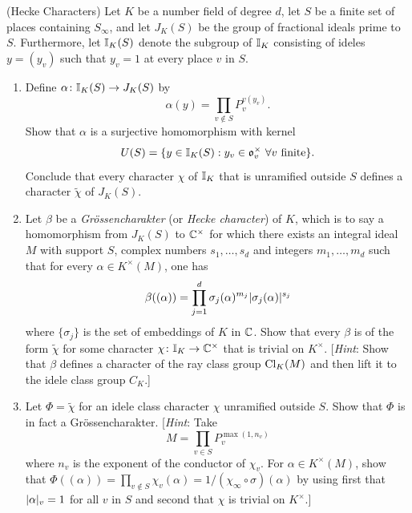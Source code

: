 \begin{exercise}[13]
  \label{ex:ch7-13}
  (Hecke Characters) Let $K$ be a number field of degree $d$, let $S$ be a
  finite set of places containing $S_\infty$, and let $J_K(S)$ be the group
  of fractional ideals prime to $S$. Furthermore, let $\mathbb{I}_K(S)$ denote the
  subgroup of $\mathbb{I}_K$ consisting of ideles $y = (y_v)$ such that $y_v = 1$ at
  every place $v$ in $S$.
  \begin{enumerate}[label=(\alph*)]
    \item Define $\alpha \colon \mathbb{I}_K(S) \to J_K(S)$ by
      \[
        \alpha(y) = \prod_{v \notin S} P_v^{v(y_v)}.
      \]
      Show that $\alpha$ is a surjective homomorphism with kernel
      \[
        U(S) = \{y \in \mathbb{I}_K(S) : y_v \in \mathfrak{o}_v^\times \
        \forall v \text{ finite}\}.
      \]
      Conclude that every character $\chi$ of $\mathbb{I}_K$ that is unramified
      outside $S$ defines a character $\widetilde{\chi}$ of $J_K(S)$.
    \item Let $\beta$ be a \emph{Gr\"ossencharakter} (or \emph{Hecke
      character}) of $K$, which is to say a homomorphism from $J_K(S)$ to
      $\mathbb{C}^\times$ for which there exists an integral ideal $M$ with support
      $S$, complex numbers $s_1, \ldots, s_d$ and integers
      $m_1, \ldots, m_d$ such that for every $\alpha \in K^\times(M)$, one
      has
      \[
        \beta((\alpha))
        = \prod_{j=1}^{d} \sigma_j(\alpha)^{m_j} \lvert\sigma_j(\alpha)\rvert^{s_j}
      \]
      where $\{\sigma_j\}$ is the set of embeddings of $K$ in $\mathbb{C}$. Show
      that every $\beta$ is of the form $\widetilde{\chi}$ for some character
      $\chi \colon \mathbb{I}_K \to \mathbb{C}^\times$ that is trivial on $K^\times$.
      [\emph{Hint}: Show that $\beta$ defines a character of the ray class
      group $\operatorname{Cl}_K(M)$ and then lift it to the idele class group $C_K$.]
    \item Let $\Phi = \widetilde{\chi}$ for an idele class character $\chi$
      unramified outside $S$. Show that $\Phi$ is in fact a
      Gr\"ossencharakter. [\emph{Hint}: Take
      \[
        M = \prod_{v \in S} P_v^{\max(1, n_v)}
      \]
      where $n_v$ is the exponent of the conductor of $\chi_v$. For
      $\alpha \in K^\times(M)$, show that
      $\Phi((\alpha)) = \prod_{v \notin S} \chi_v(\alpha)
      = 1/(\chi_\infty \circ \sigma)(\alpha)$
      by using first that $\lvert\alpha\rvert_v = 1$ for all $v$ in $S$ and second
      that $\chi$ is trivial on $K^\times$.]
  \end{enumerate}
\end{exercise}


